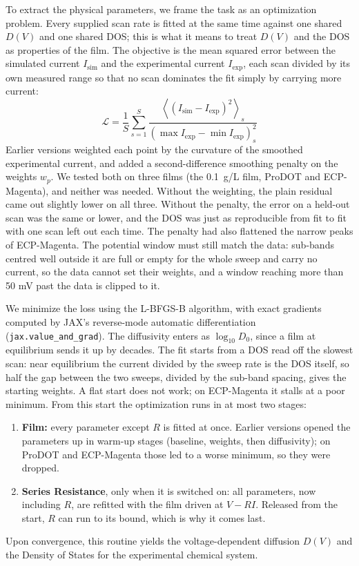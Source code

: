 \documentclass{article}
\begin{document}
To extract the physical parameters, we frame the task as an optimization problem. Every supplied scan rate is fitted at the same time against one shared $D(V)$ and one shared DOS; this is what it means to treat $D(V)$ and the DOS as properties of the film. The objective is the mean squared error between the simulated current $I_{\text{sim}}$ and the experimental current $I_{\text{exp}}$, each scan divided by its own measured range so that no scan dominates the fit simply by carrying more current:
\begin{equation}
    \mathcal{L} = \frac{1}{S}\sum_{s=1}^{S} \frac{\left\langle \left(I_{\text{sim}} - I_{\text{exp}}\right)^2 \right\rangle_s}{\left(\max I_{\text{exp}} - \min I_{\text{exp}}\right)_s^2}
\end{equation}
Earlier versions weighted each point by the curvature of the smoothed experimental current, and added a second-difference smoothing penalty on the weights $w_p$. We tested both on three films (the 0.1~g/L film, ProDOT and ECP-Magenta), and neither was needed. Without the weighting, the plain residual came out slightly lower on all three. Without the penalty, the error on a held-out scan was the same or lower, and the DOS was just as reproducible from fit to fit with one scan left out each time. The penalty had also flattened the narrow peaks of ECP-Magenta. The potential window must still match the data: sub-bands centred well outside it are full or empty for the whole sweep and carry no current, so the data cannot set their weights, and a window reaching more than 50 mV past the data is clipped to it.

We minimize the loss using the L-BFGS-B algorithm, with exact gradients computed by JAX's reverse-mode automatic differentiation (\texttt{jax.value\_and\_grad}). The diffusivity enters as $\log_{10} D_0$, since a film at equilibrium sends it up by decades. The fit starts from a DOS read off the slowest scan: near equilibrium the current divided by the sweep rate is the DOS itself, so half the gap between the two sweeps, divided by the sub-band spacing, gives the starting weights. A flat start does not work; on ECP-Magenta it stalls at a poor minimum. From this start the optimization runs in at most two stages:

\begin{enumerate}
    \item \textbf{Film:} every parameter except $R$ is fitted at once. Earlier versions opened the parameters up in warm-up stages (baseline, weights, then diffusivity); on ProDOT and ECP-Magenta those led to a worse minimum, so they were dropped.
    \item \textbf{Series Resistance}, only when it is switched on: all parameters, now including $R$, are refitted with the film driven at $V - RI$. Released from the start, $R$ can run to its bound, which is why it comes last.
\end{enumerate}

Upon convergence, this routine yields the voltage-dependent diffusion $D(V)$ and the Density of States for the experimental chemical system.
\end{document}
